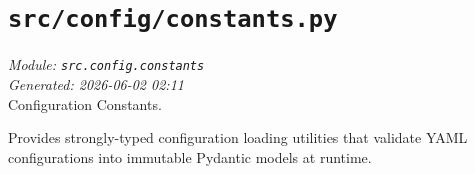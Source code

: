 
\section{\texttt{src/config/constants.py}}
\textit{Module: \texttt{src.config.constants}} \\
\textit{Generated: 2026-06-02 02:11} \\

Configuration Constants.

Provides strongly-typed configuration loading utilities that validate
YAML configurations into immutable Pydantic models at runtime.
